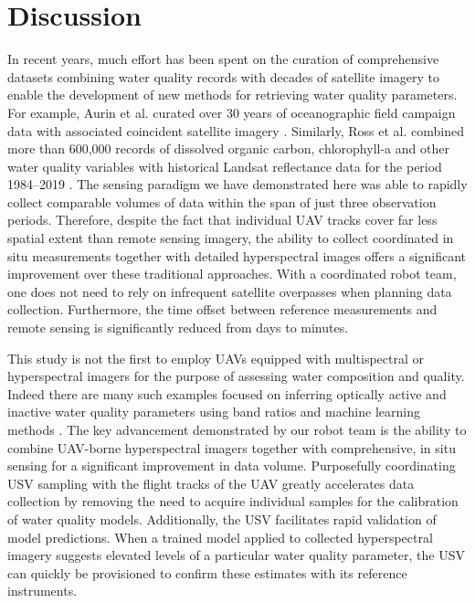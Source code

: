 \newpage

\section{Discussion}



In recent years, much effort has been spent on the curation of comprehensive datasets combining water quality records with decades of satellite imagery to enable the development of new methods for retrieving water quality parameters. For example, Aurin et al. curated over 30 years of oceanographic field campaign data with associated coincident satellite imagery \cite{aurin2018remote}. Similarly, Ross et al. combined more than 600,000 records of dissolved organic carbon, chlorophyll-a and other water quality variables with historical Landsat reflectance data for the period 1984--2019 \cite{ross2019aquasat}. The sensing paradigm we have demonstrated here was able to rapidly collect comparable volumes of data within the span of just three observation periods. Therefore, despite the fact that individual UAV tracks cover far less spatial extent than remote sensing imagery, the ability to collect coordinated in situ measurements together with detailed hyperspectral images offers a significant improvement over these traditional approaches. With a coordinated robot team, one does not need to rely on infrequent satellite overpasses when planning data collection. Furthermore, the time offset between reference measurements and remote sensing is significantly reduced from days to minutes.

This study is not the first to employ UAVs equipped with multispectral or hyperspectral imagers for the purpose of assessing water composition and quality. Indeed there are many such examples focused on inferring optically active and inactive water quality parameters using band ratios and machine learning methods \cite{vogt2016near,lu2021retrieval, zhang2022selection}. The key advancement demonstrated by our robot team is the ability to combine UAV-borne hyperspectral imagers together with comprehensive, in situ sensing for a significant improvement in data volume. Purposefully coordinating USV sampling with the flight tracks of the UAV greatly accelerates data collection by removing the need to acquire individual samples for the calibration of water quality models. Additionally, the USV facilitates rapid validation of model predictions. When a trained model applied to collected hyperspectral imagery suggests elevated levels of a particular water quality parameter, the USV can quickly be provisioned to confirm these estimates with its reference instruments. 

